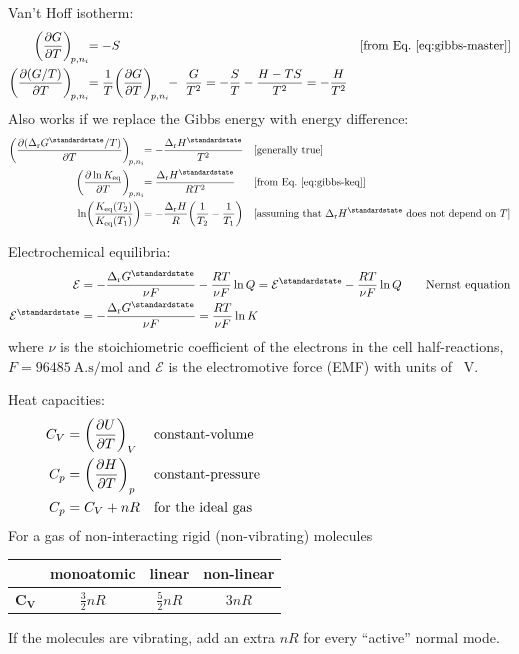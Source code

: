 \documentclass[11pt,a4paper,twoside]{article}
\numberwithin{equation}{section}
\newcommand{\eqn}[1]{Eq.~\eqref{#1}}
\newcommand{\DrG}{\ensuremath{\Delta_{\mathrm{r}}G}}
\newcommand{\DrH}{\ensuremath{\Delta_{\mathrm{r}}H}}
\newcommand{\std}{^{\standardstate}}
\begin{document}
Van't Hoff isotherm:
\begin{align}
\qty(\pdv{G}{T})_{\!p,n_i} \!\! & = -S & &
\text{[from \eqn{eq:gibbs-master}]} \\
\qty(\pdv{(G/T)}{T})_{\!p,n_i} \!\! & =
\frac{1}{T} \qty(\pdv{G}{T})_{\!p,n_i} \!\! - \ 
\frac{G}{T^2} = -\frac{S}{T} - \frac{H - TS}{T^2} = -\frac{H}{T^2}
\end{align}
Also works if we replace the Gibbs energy with energy difference:
\begin{align}
    \qty(\pdv{(\DrG\std/T)}{T})_{\!p,n_i} \!\! & = 
    -\frac{\DrH\std}{T^2} & & \text{[generally true]} \\
    \qty(\pdv{\ln K_{\rm eq}}{T})_{\!p,n_i} \!\! & = 
    \frac{\DrH\std}{R T^2} & & \text{[from \eqn{eq:gibbs-keq}]} \\
    \ln(\frac{K_{\rm eq}(T_2)}{K_{\rm eq}(T_1)}) & = 
    -\frac{\DrH}{R} \qty(\frac{1}{T_2} - \frac{1}{T_1}) & &
    \text{[assuming that $\DrH\std$ does not depend on $T$]}
\end{align}

Electrochemical equilibria:
\begin{align}
    \mathcal{E} & = -\frac{\DrG\std}{\nu F} - \frac{R T}{\nu F} \ln Q = \mathcal{E}\std - \frac{R T}{\nu F} \ln Q \qquad \text{Nernst equation}\\
    \mathcal{E}\std  & = -\frac{\DrG\std}{\nu F} = \frac{R T}{\nu F} \ln K
\end{align}
where $\nu$ is the stoichiometric coefficient of the electrons in the cell half-reactions, $F = \SI{96485}{\ampere.\second / \mole}$ and $\mathcal{E}$ is the electromotive force (EMF) with units of \SI{}{\volt}.

Heat capacities:
\begin{align}
    C_{V} & = \qty(\pdv{U}{T})_{V} & & \text{constant-volume} \\
    C_{p} & = \qty(\pdv{H}{T})_{p} & & \text{constant-pressure} \\
    C_{p} & = C_{V} + n R & & \text{for the ideal gas
    \hspace*{0.45\columnwidth}}
\end{align}
For a gas of non-interacting rigid (non-vibrating) molecules

\begin{center}
\begin{tabularx}{0.675\textwidth}{|C|C|C|C|}
    \hline
     & \textbf{monoatomic} & \textbf{linear} & \textbf{non-linear} \\
    \hline
    \rule[-1.25em]{0pt}{3.5em}$\bm{C_{V}}$ & 
        $\displaystyle \frac{3}{2} n R$ &
        $\displaystyle \frac{5}{2} n R$ & 
        $\displaystyle 3 n R$ \\
    \hline
\end{tabularx}
\end{center}
If the molecules are vibrating, add an extra $n R$ for every ``active'' normal mode.
\end{document}
